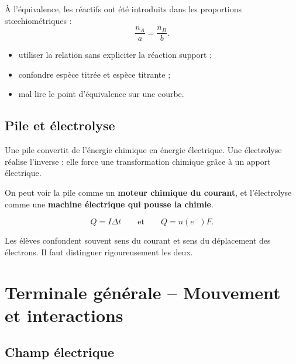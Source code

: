 \documentclass[11pt,a4paper]{article}
\begin{document}
\begin{bilan}
À l'équivalence, les réactifs ont été introduits dans les proportions stœchiométriques :
\[
\frac{n_A}{a}=\frac{n_B}{b}.
\]
\end{bilan}

\begin{erreurs}
\begin{itemize}
    \item utiliser la relation sans expliciter la réaction support ;
    \item confondre espèce titrée et espèce titrante ;
    \item mal lire le point d'équivalence sur une courbe.
\end{itemize}
\end{erreurs}

\subsection{Pile et électrolyse}

\begin{sens}
Une pile convertit de l'énergie chimique en énergie électrique.
Une électrolyse réalise l'inverse : elle force une transformation chimique grâce à un apport électrique.
\end{sens}

\begin{imagem}
On peut voir la pile comme un \textbf{moteur chimique du courant},
et l'électrolyse comme une \textbf{machine électrique qui pousse la chimie}.
\end{imagem}

\begin{bilan}
\[
Q=I\Delta t
\qquad \text{et} \qquad
Q=n(e^-)F.
\]
\end{bilan}

\begin{fausseintuition}
Les élèves confondent souvent sens du courant et sens du déplacement des électrons.
Il faut distinguer rigoureusement les deux.
\end{fausseintuition}

\newpage

\section{Terminale générale -- Mouvement et interactions}

\subsection{Champ électrique}
\end{document}
